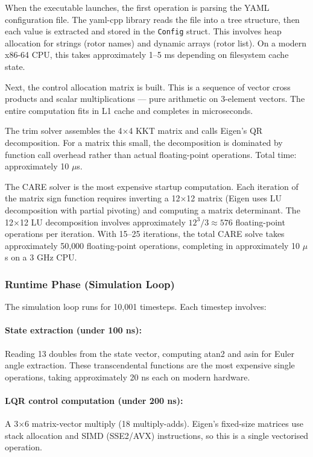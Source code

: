 \documentclass[12pt, a4paper]{article}
\begin{document}
When the executable launches, the first operation is parsing the YAML configuration file.  The yaml-cpp library reads the file into a tree structure, then each value is extracted and stored in the \texttt{Config} struct.  This involves heap allocation for strings (rotor names) and dynamic arrays (rotor list).  On a modern x86-64 CPU, this takes approximately 1--5 ms depending on filesystem cache state.

Next, the control allocation matrix is built.  This is a sequence of vector cross products and scalar multiplications --- pure arithmetic on 3-element vectors.  The entire computation fits in L1 cache and completes in microseconds.

The trim solver assembles the 4$\times$4 KKT matrix and calls Eigen's QR decomposition.  For a matrix this small, the decomposition is dominated by function call overhead rather than actual floating-point operations.  Total time: approximately 10 $\mu$s.

The CARE solver is the most expensive startup computation.  Each iteration of the matrix sign function requires inverting a 12$\times$12 matrix (Eigen uses LU decomposition with partial pivoting) and computing a matrix determinant.  The 12$\times$12 LU decomposition involves approximately $12^3/3 \approx 576$ floating-point operations per iteration.  With 15--25 iterations, the total CARE solve takes approximately 50{,}000 floating-point operations, completing in approximately 10 $\mu$s on a 3 GHz CPU.

\subsubsection{Runtime Phase (Simulation Loop)}

The simulation loop runs for 10{,}001 timesteps.  Each timestep involves:

\paragraph{State extraction (under 100 ns):}  Reading 13 doubles from the state vector, computing atan2 and asin for Euler angle extraction.  These transcendental functions are the most expensive single operations, taking approximately 20 ns each on modern hardware.

\paragraph{LQR control computation (under 200 ns):}  A 3$\times$6 matrix-vector multiply (18 multiply-adds).  Eigen's fixed-size matrices use stack allocation and SIMD (SSE2/AVX) instructions, so this is a single vectorised operation.
\end{document}
